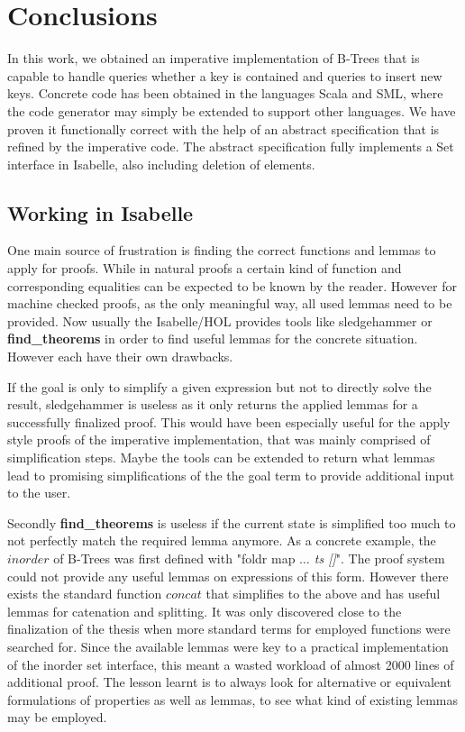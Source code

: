 

\chapter{Conclusions}\label{chapter:conclusion}

In this work, we obtained an imperative implementation
of B-Trees that is capable to handle queries whether a key is contained
and queries to insert new keys.
Concrete code has been obtained in the languages Scala and SML,
where the code generator may simply be extended to support other languages.
We have proven it functionally correct with the help of an abstract
specification that is refined by the imperative code.
The abstract specification fully implements
a Set interface in Isabelle, also including deletion of elements.


\section{Working in Isabelle}

One main source of frustration is finding the correct
functions and lemmas to apply for proofs.
While in natural proofs a certain kind of function and corresponding equalities can be
expected to be known by the reader.
However for machine checked proofs, as the only meaningful way,
all used lemmas need to be provided.
Now usually the Isabelle/HOL provides tools like sledgehammer
or \textbf{find\_theorems} in order to find useful lemmas for the concrete situation.
However each have their own drawbacks.

If the goal is only to simplify a given expression but not to
directly solve the result, sledgehammer is useless
as it only returns the applied lemmas for a successfully finalized proof.
This would have been especially useful for the apply style proofs of the
imperative implementation, that was mainly comprised of simplification steps.
Maybe the tools can be extended to return what lemmas lead to promising
simplifications of the the goal term to provide additional input to the user.

Secondly \textbf{find\_theorems} is useless if the current state
is simplified too much to not perfectly match the required lemma anymore.
As a concrete example, the $inorder$ of B-Trees was first defined
with "foldr map \textit{$\dots$ ts []}".
The proof system could not provide any useful lemmas on expressions of this form.
However there exists the standard function $concat$ that
simplifies to the above and has useful lemmas for catenation
and splitting.
It was only discovered close to the finalization of the thesis
when more standard terms for employed functions were searched for.
Since the available lemmas were key to a practical
implementation of the inorder set interface,
this meant a wasted workload of almost 2000 lines of additional proof.
The lesson learnt is to always look for alternative or equivalent
formulations of properties as well as lemmas,
to see what kind of existing lemmas may be employed.

